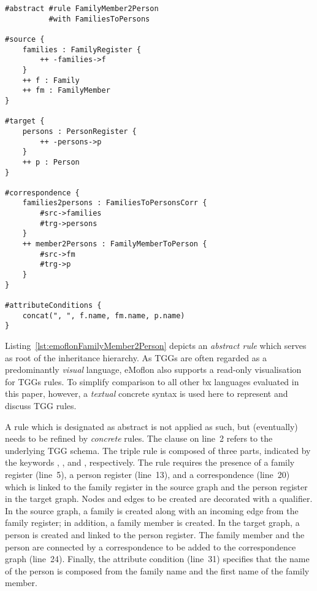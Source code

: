 \begin{lstlisting}[label={lst:emoflonFamilyMember2Person}, float=bt!, language=emoflon, caption={Mapping family members to persons}]
#abstract #rule FamilyMember2Person 
          #with FamiliesToPersons

#source { 
    families : FamilyRegister {
        ++ -families->f
    }
    ++ f : Family
    ++ fm : FamilyMember
}

#target {
    persons : PersonRegister {
        ++ -persons->p
    }
    ++ p : Person
}

#correspondence {
    families2persons : FamiliesToPersonsCorr {
        #src->families
        #trg->persons
    }
    ++ member2Persons : FamilyMemberToPerson {
        #src->fm
        #trg->p
    }
}

#attributeConditions {
    concat(", ", f.name, fm.name, p.name)
}
\end{lstlisting}


Listing~\ref{lst:emoflonFamilyMember2Person} depicts an \emph{abstract rule} which serves as root of the inheritance hierarchy.
As TGGs are often regarded as a predominantly \emph{visual} language, eMoflon also supports a read-only visualisation for TGGs rules.  
To simplify comparison to all other bx languages evaluated in this paper, however, a \emph{textual} concrete syntax is used here to represent and discuss TGG rules.

A rule which is designated as abstract is not applied as such, but (eventually) needs to be refined by \emph{concrete} rules.
The  clause on line~2 refers to the underlying TGG schema.
The triple rule is composed of three parts, indicated by the keywords , , and , respectively. The rule requires the presence of a family register (line~5), a person register (line~13), and a correspondence (line~20) which is linked to the family register in the source graph and the person register in the target graph. Nodes and edges to be created are decorated with a \code{++} qualifier. In the source graph, a family is created along with an incoming edge from the family register; in addition, a family member is created. In the target graph, a person is created and linked to the person register. The family member and the person are connected by a correspondence to be added to the correspondence graph (line~24).
Finally, the attribute condition (line~31) specifies that the name of the person is composed from the family name and the first name of the family member.

